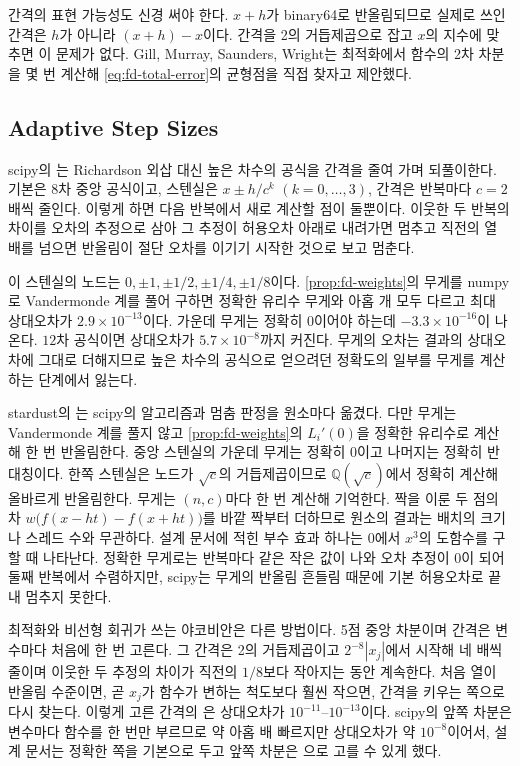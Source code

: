 간격의 표현 가능성도 신경 써야 한다. $x+h$가 binary64로 반올림되므로 실제로 쓰인 간격은 $h$가 아니라 $(x+h)-x$이다. 간격을 2의 거듭제곱으로 잡고 $x$의 지수에 맞추면 이 문제가 없다. Gill, Murray, Saunders, Wright는 최적화에서 함수의 2차 차분을 몇 번 계산해 \eqref{eq:fd-total-error}의 균형점을 직접 찾자고 제안했다\cite{gill1983}.

\subsection{Adaptive Step Sizes}

scipy의 는 Richardson 외삽 대신 높은 차수의 공식을 간격을 줄여 가며 되풀이한다. 기본은 $8$차 중앙 공식이고, 스텐실은 $x\pm h/c^k$ $(k=0,\dots,3)$, 간격은 반복마다 $c=2$배씩 줄인다. 이렇게 하면 다음 반복에서 새로 계산할 점이 둘뿐이다. 이웃한 두 반복의 차이를 오차의 추정으로 삼아 그 추정이 허용오차 아래로 내려가면 멈추고 직전의 열 배를 넘으면 반올림이 절단 오차를 이기기 시작한 것으로 보고 멈춘다.

이 스텐실의 노드는 $0,\pm1,\pm1/2,\pm1/4,\pm1/8$이다. \cref{prop:fd-weights}의 무게를 numpy로 Vandermonde 계를 풀어 구하면 정확한 유리수 무게와 아홉 개 모두 다르고 최대 상대오차가 $2.9\times10^{-13}$이다. 가운데 무게는 정확히 $0$이어야 하는데 $-3.3\times10^{-16}$이 나온다. $12$차 공식이면 상대오차가 $5.7\times10^{-8}$까지 커진다. 무게의 오차는 결과의 상대오차에 그대로 더해지므로 높은 차수의 공식으로 얻으려던 정확도의 일부를 무게를 계산하는 단계에서 잃는다.

\begin{instardust}
stardust의 는 scipy의 알고리즘과 멈춤 판정을 원소마다 옮겼다. 다만 무게는 Vandermonde 계를 풀지 않고 \cref{prop:fd-weights}의 $L_i'(0)$을 정확한 유리수로 계산해 한 번 반올림한다. 중앙 스텐실의 가운데 무게는 정확히 $0$이고 나머지는 정확히 반대칭이다. 한쪽 스텐실은 노드가 $\sqrt c$의 거듭제곱이므로 $\mathbb Q(\sqrt c)$에서 정확히 계산해 올바르게 반올림한다. 무게는 $(n,c)$마다 한 번 계산해 기억한다. 짝을 이룬 두 점의 차 $w\bigl(f(x-ht)-f(x+ht)\bigr)$를 바깥 짝부터 더하므로 원소의 결과는 배치의 크기나 스레드 수와 무관하다. 설계 문서에 적힌 부수 효과 하나는 $0$에서 $x^3$의 도함수를 구할 때 나타난다. 정확한 무게로는 반복마다 같은 작은 값이 나와 오차 추정이 $0$이 되어 둘째 반복에서 수렴하지만, scipy는 무게의 반올림 흔들림 때문에 기본 허용오차로 끝내 멈추지 못한다.
\end{instardust}

\begin{instardust}
최적화와 비선형 회귀가 쓰는 야코비안은 다른 방법이다. 5점 중앙 차분이며 간격은 변수마다 처음에 한 번 고른다. 그 간격은 2의 거듭제곱이고 $2^{-8}|x_j|$에서 시작해 네 배씩 줄이며 이웃한 두 추정의 차이가 직전의 $1/8$보다 작아지는 동안 계속한다. 처음 열이 반올림 수준이면, 곧 $x_j$가 함수가 변하는 척도보다 훨씬 작으면, 간격을 키우는 쪽으로 다시 찾는다. 이렇게 고른 간격의 은 상대오차가 $10^{-11}$--$10^{-13}$이다. scipy의 앞쪽 차분은 변수마다 함수를 한 번만 부르므로 약 아홉 배 빠르지만 상대오차가 약 $10^{-8}$이어서, 설계 문서는 정확한 쪽을 기본으로 두고 앞쪽 차분은 으로 고를 수 있게 했다.
\end{instardust}

